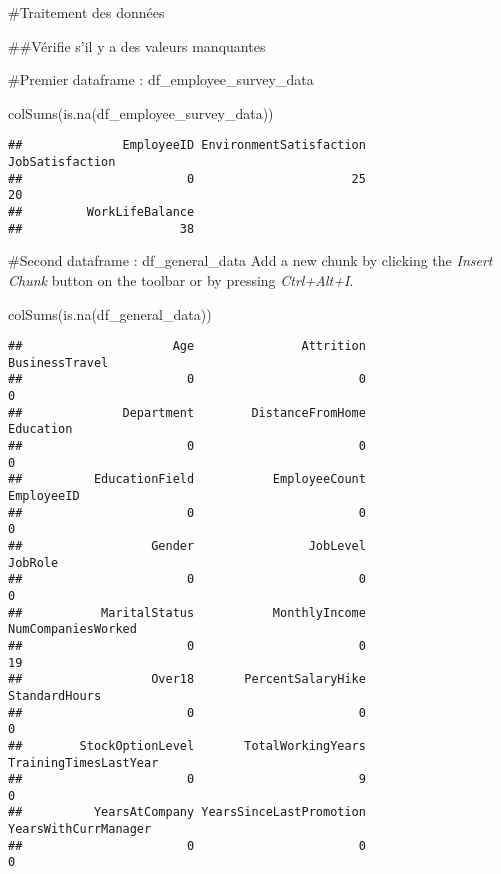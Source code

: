 \documentclass[
]{article}
\newenvironment{Shaded}{\begin{snugshade}}{\end{snugshade}}
\newcommand{\FunctionTok}[1]{\textcolor[rgb]{0.00,0.00,0.00}{#1}}
\newcommand{\NormalTok}[1]{#1}
\begin{document}
\#Traitement des données

\#\#Vérifie s'il y a des valeurs manquantes

\#Premier dataframe : df\_employee\_survey\_data

\begin{Shaded}
\begin{Highlighting}[]
\FunctionTok{colSums}\NormalTok{(}\FunctionTok{is.na}\NormalTok{(df\_employee\_survey\_data))}
\end{Highlighting}
\end{Shaded}

\begin{verbatim}
##              EmployeeID EnvironmentSatisfaction         JobSatisfaction 
##                       0                      25                      20 
##         WorkLifeBalance 
##                      38
\end{verbatim}

\#Second dataframe : df\_general\_data Add a new chunk by clicking the
\emph{Insert Chunk} button on the toolbar or by pressing
\emph{Ctrl+Alt+I}.

\begin{Shaded}
\begin{Highlighting}[]
\FunctionTok{colSums}\NormalTok{(}\FunctionTok{is.na}\NormalTok{(df\_general\_data))}
\end{Highlighting}
\end{Shaded}

\begin{verbatim}
##                     Age               Attrition          BusinessTravel 
##                       0                       0                       0 
##              Department        DistanceFromHome               Education 
##                       0                       0                       0 
##          EducationField           EmployeeCount              EmployeeID 
##                       0                       0                       0 
##                  Gender                JobLevel                 JobRole 
##                       0                       0                       0 
##           MaritalStatus           MonthlyIncome      NumCompaniesWorked 
##                       0                       0                      19 
##                  Over18       PercentSalaryHike           StandardHours 
##                       0                       0                       0 
##        StockOptionLevel       TotalWorkingYears   TrainingTimesLastYear 
##                       0                       9                       0 
##          YearsAtCompany YearsSinceLastPromotion    YearsWithCurrManager 
##                       0                       0                       0
\end{verbatim}
\end{document}

